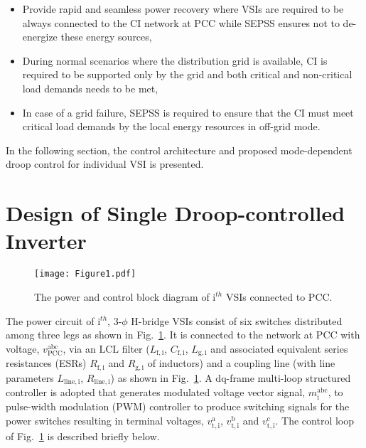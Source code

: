 \documentclass[journal]{IEEEtran}
\begin{document}
\begin{itemize}
    \item Provide rapid and seamless power recovery where VSIs are required to be always connected to the CI network at PCC while SEPSS ensures not to de-energize these energy sources,
    \item During normal scenarios where the distribution grid is available, CI is required to be supported only by the grid and both critical and non-critical load demands needs to be met,
    \item In case of a grid failure, SEPSS is required to ensure that the CI must meet critical load demands by the local energy resources in off-grid mode. 
\end{itemize}
In the following section, the control architecture and proposed mode-dependent droop control for individual VSI is presented.
\section{Design of Single Droop-controlled Inverter}\label{control}
\begin{figure}[t]
	\centering
    \texttt{[image: Figure1.pdf]}%
	\caption{The power and control block diagram of $\mathrm{i}^{th}$ VSIs connected to PCC.}
	\label{fig:circuit}
\end{figure}
The power circuit of $\mathrm{i}^{th}$, $3$-$\phi$ H-bridge VSIs consist of six switches distributed among three legs as shown in Fig.~\ref{fig:circuit}. It is connected to the network at PCC with voltage, $v^\mathrm{abc}_\mathrm{PCC}$, via an $\mathrm{LCL}$ filter ($L_\mathrm{f,i}$, $C_\mathrm{f,i}$, $L_\mathrm{g,i}$ and associated equivalent series resistances (ESRs) $R_\mathrm{f,i}$ and $R_\mathrm{g,i}$ of inductors) and a coupling line (with line parameters $L_\mathrm{line,i}$, $R_\mathrm{line,i}$) as shown in Fig.~\ref{fig:circuit}. A $\mathrm{dq}$-frame multi-loop structured controller is adopted that generates modulated voltage vector signal, $m^\mathrm{abc}_\mathrm{i}$, to pulse-width modulation (PWM) controller to produce switching signals for the power switches resulting in terminal voltages, $v^\mathrm{a}_\mathrm{t,i}$, $v^\mathrm{b}_\mathrm{t,i}$ and $v^\mathrm{c}_\mathrm{t,i}$. The control loop of Fig.~\ref{fig:circuit} is described briefly below.
\end{document}
